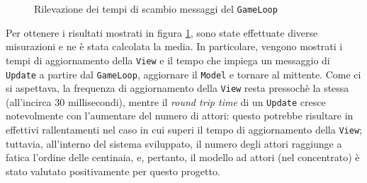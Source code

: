 \begin{figure}[H]
    \centering
    \label{plot:performance-evaluation}
    \caption{Rilevazione dei tempi di scambio messaggi del \texttt{GameLoop}}
\end{figure}

Per ottenere i risultati mostrati in figura \ref{plot:performance-evaluation}, sono state effettuate diverse misurazioni
e ne è stata calcolata la media. In particolare, vengono mostrati i tempi di aggiornamento della \texttt{View} e il
tempo che impiega un messaggio di \texttt{Update} a partire dal \texttt{GameLoop}, aggiornare il \texttt{Model} e
tornare al mittente. Come ci si aspettava, la frequenza di aggiornamento della \texttt{View} resta pressochè la stessa
(all'incirca 30 millisecondi), mentre il \textit{round trip time} di un \texttt{Update} cresce notevolmente con
l'aumentare del numero di attori: questo potrebbe risultare in effettivi rallentamenti nel caso in cui superi il tempo
di aggiornamento della \texttt{View}; tuttavia, all'interno del sistema sviluppato, il numero degli attori raggiunge a
fatica l'ordine delle centinaia, e, pertanto, il modello ad attori (nel concentrato) è stato valutato positivamente per
questo progetto.

